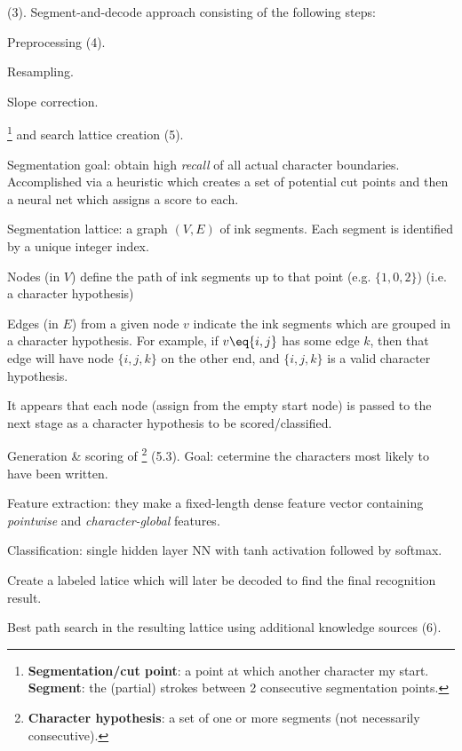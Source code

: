\documentclass[11pt]{article}
\newcommand\myspace[1][]{\vspace{#1\bigskipamount}}
\newcommand\p{\Needspace{10\baselineskip} \noindent}
\newcommand\bluesec[1]{\myspace \p \blue{#1}}
\begin{document}
\bluesec{System Architecture} (3). Segment-and-decode approach consisting of the following steps:
\begin{compactitem}
	\item Preprocessing (4).
	\begin{compactenum}
		\item Resampling. 
		\item Slope correction.
	\end{compactenum}
	
	\item {}\footnote{\textbf{Segmentation/cut point}: a point at which another character my start. \textbf{Segment}: the (partial) strokes between 2 consecutive segmentation points.} and search lattice creation (5).
	\begin{compactenum}
		\item Segmentation goal: obtain high \textit{recall} of all actual character boundaries. Accomplished via a heuristic which creates a set of potential cut points and then a neural net which assigns a score to each.
		
		\item Segmentation lattice: a graph $(V, E)$ of ink segments. Each segment is identified by a unique integer index. 
		\begin{compactitem}
			\item Nodes (in $V$) define the path of ink segments up to that point (e.g. $\{1, 0, 2\}$) (i.e. a character hypothesis)
			\item Edges (in $E$) from a given node $v$ indicate the ink segments which are grouped in a character hypothesis. For example, if $v\eq\{i, j\}$ has some edge $k$, then that edge will have node $\{i, j, k\}$ on the other end, and $\{i, j, k\}$ is a valid character hypothesis. 
		\end{compactitem}
		It appears that each node (assign from the empty start node) is passed to the next stage as a character hypothesis to be scored/classified.
	\end{compactenum}
	
	\item Generation \& scoring of \footnote{\textbf{Character hypothesis}: a set of one or more segments (not necessarily consecutive).} (5.3). Goal: cetermine the characters most likely to have been written.
	\begin{compactenum}
		\item Feature extraction: they make a fixed-length dense feature vector containing \textit{pointwise} and \textit{character-global} features.
		
		\item Classification: single hidden layer NN with tanh activation followed by softmax.
		
		\item Create a labeled latice which will later be decoded to find the final recognition result.
	\end{compactenum}
	
	\item Best path search in the resulting lattice using additional knowledge sources (6). 
\end{compactitem}
\end{document}
